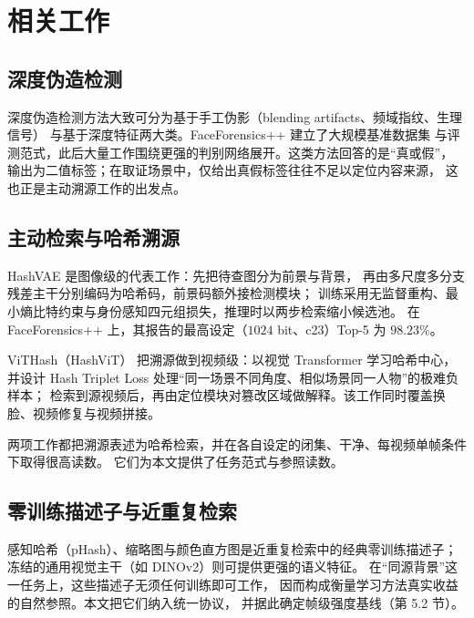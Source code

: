 \section{相关工作}

\subsection{深度伪造检测}

深度伪造检测方法大致可分为基于手工伪影（blending artifacts、频域指纹、生理信号）
与基于深度特征两大类。FaceForensics++\cite{rossler2019faceforensics} 建立了大规模基准数据集
与评测范式，此后大量工作围绕更强的判别网络展开。这类方法回答的是“真或假”，
输出为二值标签；在取证场景中，仅给出真假标签往往不足以定位内容来源，
这也正是主动溯源工作的出发点。

\subsection{主动检索与哈希溯源}

HashVAE\cite{liu2026hashvae} 是图像级的代表工作：先把待查图分为前景与背景，
再由多尺度多分支残差主干分别编码为哈希码，前景码额外接检测模块；
训练采用无监督重构、最小熵比特约束与身份感知四元组损失，推理时以两步检索缩小候选池。
在 FaceForensics++ 上，其报告的最高设定（$1024$ bit、c23）Top-5 为 $98.23\%$。

ViTHash（HashViT）\cite{pei2021vithash} 把溯源做到视频级：以视觉 Transformer 学习哈希中心，
并设计 Hash Triplet Loss 处理“同一场景不同角度、相似场景同一人物”的极难负样本；
检索到源视频后，再由定位模块对篡改区域做解释。该工作同时覆盖换脸、视频修复与视频拼接。

两项工作都把溯源表述为哈希检索，并在各自设定的闭集、干净、每视频单帧条件下取得很高读数。
它们为本文提供了任务范式与参照读数。

\subsection{零训练描述子与近重复检索}

感知哈希（pHash）、缩略图与颜色直方图是近重复检索中的经典零训练描述子；
冻结的通用视觉主干（如 DINOv2\cite{oquab2024dinov2}）则可提供更强的语义特征。
在“同源背景”这一任务上，这些描述子无须任何训练即可工作，
因而构成衡量学习方法真实收益的自然参照。本文把它们纳入统一协议，
并据此确定帧级强度基线（第 5.2 节）。

